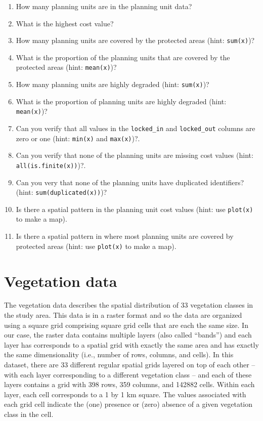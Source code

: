 \documentclass[
  12pt,
]{book}
\makeatletter
\providecommand{\tightlist}{%
  \setlength{\itemsep}{0pt}\setlength{\parskip}{0pt}}
\newenvironment{kframe}{%
\medskip{}
\setlength{\fboxsep}{.8em}
 \def\at@end@of@kframe{}%
 \ifinner\ifhmode%
  \def\at@end@of@kframe{\end{minipage}}%
  \begin{minipage}{\columnwidth}%
 \fi\fi%
 \def\FrameCommand##1{\hskip\@totalleftmargin \hskip-\fboxsep
 \colorbox{shadecolor}{##1}\hskip-\fboxsep
     \hskip-\linewidth \hskip-\@totalleftmargin \hskip\columnwidth}%
 \MakeFramed {\advance\hsize-\width
   \@totalleftmargin\z@ \linewidth\hsize
   \@setminipage}}%
 {\par\unskip\endMakeFramed%
 \at@end@of@kframe}
\newenvironment{rmdblock}[1]
  {
  \begin{itemize}
  \renewcommand{\labelitemi}{
    \raisebox{-.7\height}[0pt][0pt]{
      {\setkeys{Gin}{width=3em,keepaspectratio}\texttt{[image: images/\#1]}}
    }
  }
  \setlength{\fboxsep}{1em}
  \begin{kframe}
  \item
  }
  {
  \end{kframe}
  \end{itemize}
  }
\newenvironment{rmdquestion}
  {\begin{rmdblock}{question}}
  {\end{rmdblock}}
\makeatother
\begin{document}
\begin{rmdquestion}
\begin{enumerate}
\def\labelenumi{\arabic{enumi}.}
\tightlist
\item
  How many planning units are in the planning unit data?
\item
  What is the highest cost value?
\item
  How many planning units are covered by the protected areas (hint: \texttt{sum(x)})?
\item
  What is the proportion of the planning units that are covered by the protected areas (hint: \texttt{mean(x)})?
\item
  How many planning units are highly degraded (hint: \texttt{sum(x)})?
\item
  What is the proportion of planning units are highly degraded (hint: \texttt{mean(x)})?
\item
  Can you verify that all values in the \texttt{locked\_in} and \texttt{locked\_out} columns are zero or one (hint: \texttt{min(x)} and \texttt{max(x)})?.
\item
  Can you verify that none of the planning units are missing cost values (hint: \texttt{all(is.finite(x))})?.
\item
  Can you very that none of the planning units have duplicated identifiers? (hint: \texttt{sum(duplicated(x))})?
\item
  Is there a spatial pattern in the planning unit cost values (hint: use \texttt{plot(x)} to make a map).
\item
  Is there a spatial pattern in where most planning units are covered by protected areas (hint: use \texttt{plot(x)} to make a map).
\end{enumerate}
\end{rmdquestion}

\hypertarget{vegetation-data}{%
\section{Vegetation data}\label{vegetation-data}}

The vegetation data describes the spatial distribution of 33 vegetation classes in the study area. This data is in a raster format and so the data are organized using a square grid comprising square grid cells that are each the same size. In our case, the raster data contains multiple layers (also called ``bands'') and each layer has corresponds to a spatial grid with exactly the same area and has exactly the same dimensionality (i.e., number of rows, columns, and cells). In this dataset, there are 33 different regular spatial grids layered on top of each other -- with each layer corresponding to a different vegetation class -- and each of these layers contains a grid with 398 rows, 359 columns, and 142882 cells. Within each layer, each cell corresponds to a 1 by 1 km square. The values associated with each grid cell indicate the (one) presence or (zero) absence of a given vegetation class in the cell.
\end{document}
